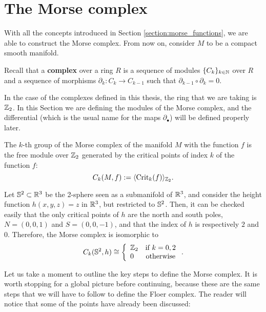 \section{The Morse complex} \label{section:morse_complex}

With all the concepts introduced in Section \ref{section:morse_functions}, we are able to construct the Morse complex. From now on, consider $M$ to be a compact smooth manifold.

\begin{deff}
Recall that a {\bf complex} over a ring $R$ is a sequence of modules $\{ C_k \}_{k \in \mathbb{N}}$ over $R$ and a sequence of morphisms $\partial_k : C_k \rightarrow C_{k-1}$ such that $\partial_{k-1} \circ \partial_k = 0$.
\end{deff}

In the case of the complexes defined in this thesis, the ring that we are taking is $\mathbb{Z}_2$. In this Section we are defining the modules of the Morse complex, and the differential (which is the usual name for the maps $\partial_{\bullet}$) will be defined properly later.

\begin{deff}
The $k$-th group of the Morse complex of the manifold $M$ with the function $f$ is the free module over $\mathbb{Z}_2$ generated by the critical points of index $k$ of the function $f$:
\begin{displaymath}
C_k(M,f) := \langle \text{Crit}_k(f) \rangle_{\mathbb{Z}_2} .
\end{displaymath}
\end{deff}

\begin{exmpl}
Let $\mathbb{S}^2 \subset \mathbb{R}^3$ be the 2-sphere seen as a submanifold of $\mathbb{R}^3$, and consider the height function $h(x,y,z) = z$ in $\mathbb{R}^3$, but restricted to $\mathbb{S}^2$. Then, it can be checked easily that the only critical points of $h$ are the north and south poles, $N = (0,0,1)$ and $S = (0,0,-1)$, and that the index of $h$ is respectively $2$ and $0$. Therefore, the Morse complex is isomorphic to
$$C_k(\mathbb{S}^2,h) \cong \left\{ \begin{array}{lc} \mathbb{Z}_2 & \text{if } k = 0, 2 \\ 0 & \text{otherwise} \end{array}\right. .$$
\end{exmpl}

Let us take a moment to outline the key steps to define the Morse complex. It is worth stopping for a global picture before continuing, because these are the same steps that we will have to follow to define the Floer complex. The reader will notice that some of the points have already been discussed:

